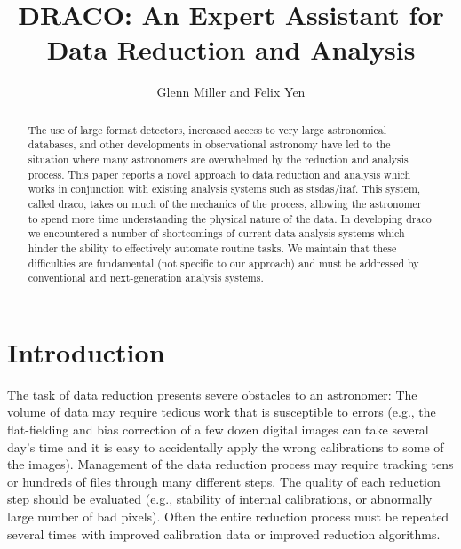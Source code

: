 



\title{DRACO: An Expert Assistant for Data Reduction and Analysis}
\author{Glenn Miller and Felix Yen}

\begin{abstract}

The use of large format detectors, increased access to very large 
astronomical databases, and other developments in observational astronomy 
have led to the situation where many astronomers are overwhelmed by the 
reduction and analysis process. This paper reports a novel approach to data 
reduction and analysis which works in conjunction with existing analysis 
systems such as {\sc stsdas/iraf}. This system, called {\sc draco}, takes 
on much of the mechanics of the process, allowing the astronomer to spend 
more time understanding the physical nature of the data. In developing {\sc 
draco} we encountered a number of shortcomings of current data analysis 
systems which hinder the ability to effectively automate routine tasks. We 
maintain that these difficulties are fundamental (not specific to our 
approach) and must be addressed by conventional and next-generation 
analysis systems. 

\end{abstract}


\section{Introduction}

The task of data reduction presents severe obstacles to an astronomer: The 
volume of data may require tedious work that is susceptible to errors 
(e.g., the flat-fielding and bias correction of a few dozen digital images 
can take several day's time and it is easy to accidentally apply the wrong 
calibrations to some of the images). Management of the data reduction 
process may require tracking tens or hundreds of files through many 
different steps. The quality of each reduction step should be evaluated 
(e.g., stability of internal calibrations, or abnormally large number of 
bad pixels). Often the entire reduction process must be repeated several 
times with improved calibration data or improved reduction algorithms.

